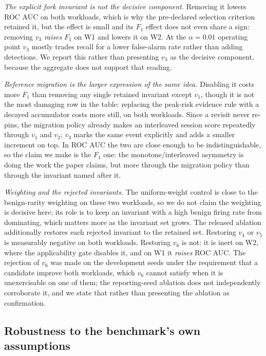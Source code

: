 \documentclass[conference]{IEEEtran}
\begin{document}
\emph{The explicit fork invariant is not the decisive component.}  Removing it
lowers ROC AUC on both workloads, which is why the pre-declared selection
criterion retained it, but the effect is small and its $F_1$ effect does not even
share a sign: removing $v_3$ \emph{raises} $F_1$ on W1 and lowers it on W2.  At
the $\alpha=0.01$ operating point $v_3$ mostly trades recall for a lower
false-alarm rate rather than adding detections.  We report this rather than
presenting $v_3$ as the decisive component, because the aggregate does not
support that reading.

\emph{Reference migration is the larger expression of the same idea.}  Disabling
it costs more $F_1$ than removing any single retained invariant except $v_1$,
though it is not the most damaging row in the table: replacing the peak-risk
evidence rule with a decayed accumulator costs more still, on both workloads.
Since a revisit never re-pins, the migration policy already makes an interleaved
session score repeatedly through $v_1$ and $v_2$; $v_3$ marks the same event
explicitly and adds a smaller increment on top.  In ROC AUC the two are close
enough to be indistinguishable, so the claim we make is the $F_1$ one: the
monotone/interleaved asymmetry is doing the work the paper claims, but more
through the migration policy than through the invariant named after it.

\emph{Weighting and the rejected invariants.}  The uniform-weight control is
close to the benign-rarity weighting on these two workloads, so we do not claim
the weighting is decisive here; its role is to keep an invariant with a high
benign firing rate from dominating, which matters more as the invariant set
grows.  The released ablation additionally restores each rejected invariant to
the retained set.  Restoring $v_4$ or $v_5$ is measurably negative on both
workloads.  Restoring $v_6$ is not: it is inert on W2, where the applicability
gate disables it, and on W1 it \emph{raises} ROC AUC.  The rejection of $v_6$ was
made on the development seeds under the requirement that a candidate improve both
workloads, which $v_6$ cannot satisfy when it is unexercisable on one of them;
the reporting-seed ablation does not independently corroborate it, and we state
that rather than presenting the ablation as confirmation.

\subsection{Robustness to the benchmark's own assumptions}
\label{sec:robustness}
\label{sec:crossover}
\end{document}
